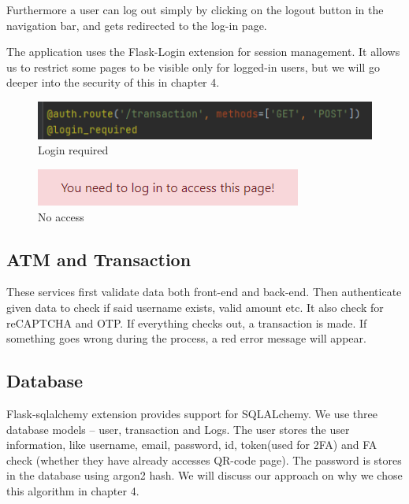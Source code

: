 Furthermore a user can log out simply by clicking on the logout button in the navigation bar, and gets redirected to the log-in page. 

The application uses the Flask-Login extension for session management. It allows us to restrict some pages to be visible only for logged-in users, but we will go deeper into the security of this in chapter 4. %

\begin{figure}[H]
   \centering
   \includegraphics[width=\textwidth]{pics/pic9.1 loginrequired.PNG}
   \caption{Login required}
   \label{fig:cha2fig2loginrequired}
\end{figure}

\begin{figure}[H]
   \centering
   \includegraphics[width=\textwidth]{pics/pic9.2 need to log in.PNG}
   \caption{No access}
   \label{fig:cha2fig3noaccess}
\end{figure}

\subsection{ATM and Transaction}

These services first validate data both front-end and back-end. Then authenticate given data to check if said username exists, valid amount etc. It also check for reCAPTCHA and OTP. If everything checks out, a transaction is made. If something goes wrong during the process, a red error message will appear. 

\subsection{Database}

Flask-sqlalchemy extension provides support for SQLALchemy. We use three database models – user, transaction and Logs. The user stores the user information, like username, email, password, id, token(used for 2FA) and FA check (whether they have already accesses QR-code page). The password is stores in the database using argon2 hash. We will discuss our approach on why we chose this algorithm in chapter 4. 

